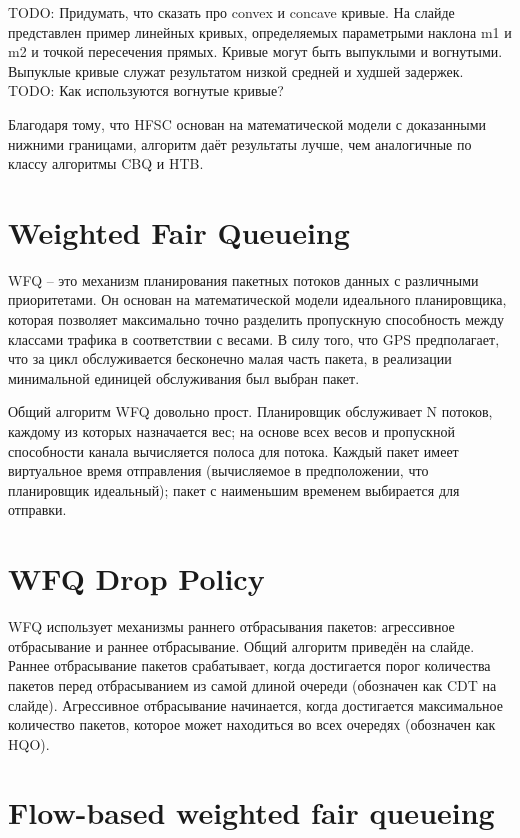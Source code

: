 \documentclass[12pt]{ncc}
\begin{document}
	TODO: Придумать, что сказать про convex и concave кривые.
	На слайде представлен пример линейных кривых, определяемых
	параметрыми наклона m1 и m2 и точкой пересечения прямых.
	Кривые могут быть выпуклыми и вогнутыми. Выпуклые кривые
	служат результатом низкой средней и худшей задержек.
	TODO: Как используются вогнутые кривые?

	Благодаря тому, что HFSC основан на математической модели с
	доказанными нижними границами, алгоритм даёт результаты лучше,
	чем аналогичные по классу алгоритмы CBQ и HTB.

	\section{Weighted Fair Queueing}

	WFQ -- это механизм планирования пакетных потоков данных с различными
	приоритетами. Он основан на математической модели идеального
	планировщика, которая позволяет максимально точно разделить
	пропускную способность между классами трафика в соответствии с весами.
	В силу того, что GPS предполагает, что за цикл обслуживается
	бесконечно малая часть пакета, в реализации минимальной единицей
	обслуживания был выбран пакет.

	Общий алгоритм WFQ довольно прост. Планировщик обслуживает N потоков,
	каждому из которых назначается вес; на основе всех весов
	и пропускной способности канала вычисляется полоса для потока.
	Каждый пакет имеет виртуальное время отправления (вычисляемое в
	предположении, что планировщик идеальный); пакет с наименьшим
	временем выбирается для отправки.

	\section{WFQ Drop Policy}

    WFQ использует механизмы раннего отбрасывания пакетов:
	агрессивное отбрасывание и раннее отбрасывание.
	Общий алгоритм приведён на слайде.
	Раннее отбрасывание пакетов срабатывает, когда
	достигается порог количества пакетов перед отбрасыванием из
	самой длиной очереди (обозначен как CDT на слайде).
	Агрессивное отбрасывание начинается, когда достигается
	максимальное количество пакетов, которое может находиться
	во всех очередях (обозначен как HQO).


	\section{Flow-based weighted fair queueing}
\end{document}
